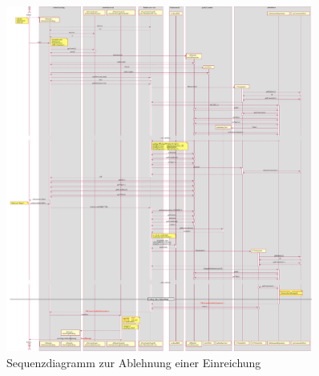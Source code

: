\begin{figure}[H]
    \centering
    \includegraphics[width=0.9\textwidth]{graphics/reject_submission}
    \caption{Sequenzdiagramm zur Ablehnung einer Einreichung}
    \label{fig:rejection-sequence}
\end{figure}
